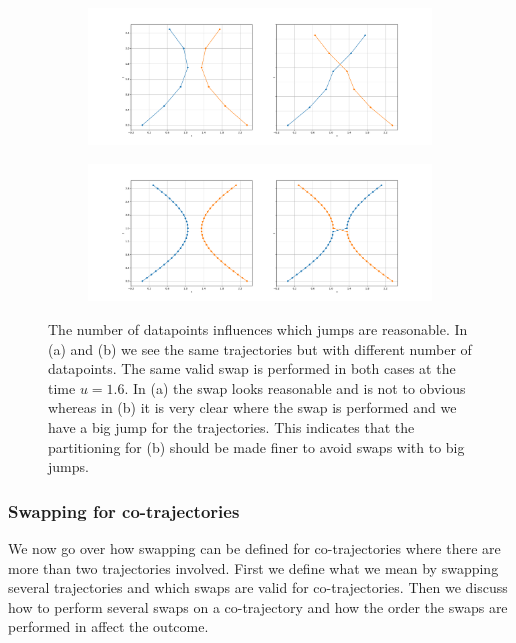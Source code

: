 \documentclass[12pt]{article}
\newcommand{\swaptime}{u}
\theoremstyle{definition}
\begin{document}
\begin{figure}
    \centering
    \begin{subfigure}[t]{\textwidth}
      \includegraphics[width=\textwidth]{jumps-1.pdf}
      \caption{}
      \label{fig:jumps-1}
    \end{subfigure}

    \begin{subfigure}[t]{\textwidth}
      \includegraphics[width=\textwidth]{jumps-2.pdf}
      \caption{}
      \label{fig:jumps-2}
    \end{subfigure}
    \caption{The number of datapoints influences which jumps are
      reasonable. In (a) and (b) we see the same trajectories but with
      different number of datapoints. The same valid swap is
      performed in both cases at the time \(\swaptime = 1.6\). In (a)
      the swap looks reasonable and is not to obvious whereas in (b)
      it is very clear where the swap is performed and we have a big
      jump for the trajectories. This indicates that the partitioning
      for (b) should be made finer to avoid swaps with to big jumps.}
    \label{fig:jumps}
\end{figure}

\subsubsection{Swapping for co-trajectories}
We now go over how swapping can be defined for co-trajectories where
there are more than two trajectories involved. First we define what we
mean by swapping several trajectories and which swaps are valid for
co-trajectories. Then we discuss how to perform several swaps on a
co-trajectory and how the order the swaps are performed in affect the
outcome.
\end{document}
